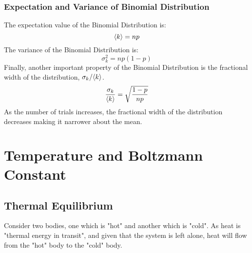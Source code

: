 \documentclass[12pt, oneside]{book}
\DeclarePairedDelimiter{\evdel}{\langle}{\rangle}
\newcommand{\ev}{\evdel}
\begin{document}
\subsubsection{Expectation and Variance of Binomial Distribution}
The expectation value of the Binomial Distribution is:
\[ \ev{k} = np \]
The variance of the Binomial Distribution is:
\[ \sigma_k^2 = np\left(1-p\right) \]
Finally, another important property of the Binomial Distribution is the fractional width of the distribution, \(\sigma_k/\ev{k}\).
\[ \frac{\sigma_k}{\ev{k}} = \sqrt{ \frac{1-p}{np} } \]
As the number of trials increases, the fractional width of the distribution decreases making it narrower about the mean.

\section{Temperature and Boltzmann Constant}
\subsection{Thermal Equilibrium}
Consider two bodies, one which is "hot" and another which is "cold".
As heat is "thermal energy in transit", and given that the system is left alone, heat will flow from the "hot" body to the "cold" body.
\end{document}

